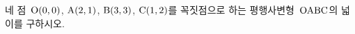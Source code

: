 네 점~$\mathrm{O}(0{,}\mkern3mu\mathopen{}0)$, $\mathrm{A}(2{,}\mkern3mu\mathopen{}1)$, $\mathrm{B}(3{,}\mkern3mu\mathopen{}3)$, $\mathrm{C}(1{,}\mkern3mu\mathopen{}2)$를 꼭짓점으로 하는 평행사변형~$\mathrm{OABC}$의 넓이를 구하시오.
